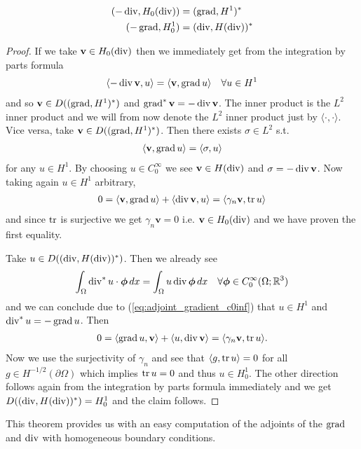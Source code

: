 \documentclass[../main.tex]{subfiles}
\begin{document}
\begin{theorem}\label{thm:adjoints_grad_div_without_bc}
    \begin{align}
        (-\operatorname{div}, H_0(\operatorname{div})) &= (\operatorname{grad}, H^1)^* \\
        (-\operatorname{grad}, H_0^1) &= (\operatorname{div}, H(\operatorname{div}))^*
    \end{align}
\end{theorem}
\begin{proof}
    If we take $\mathbf{v} \in H_0(\operatorname{div})$ then we immediately get 
    from the integration by parts formula
    \begin{align*}
        \langle -\operatorname{div} \mathbf{v}, u \rangle = \langle \mathbf{v}, \operatorname{grad} u \rangle \quad \forall u \in H^1
    \end{align*}
    and so $\mathbf{v} \in D((\operatorname{grad}, H^1)^*)$ and $\operatorname{grad}^* \mathbf{v} = -\operatorname{div} \mathbf{v}$.
    The inner product is the $L^2$ inner product and we will from now denote the $L^2$ inner 
    product just by $\langle \cdot , \cdot \rangle$.
    Vice versa, take $\mathbf{v} \in D((\operatorname{grad}, H^1)^*)$. Then there exists 
    $\sigma \in L^2$ s.t.
    \begin{align*}
        \langle \mathbf{v}, \operatorname{grad} u\rangle = \langle \sigma, u \rangle
    \end{align*}
    for any $u \in H^1$. By choosing $u \in C_0^\infty$ we see 
    $\mathbf{v} \in H(\operatorname{div})$ and $\sigma = -\operatorname{div} \mathbf{v}$. 
    Now taking again $u \in H^1$ arbitrary,
    \begin{align*}
        0 = \langle \mathbf{v}, \operatorname{grad} u \rangle + \langle \operatorname{div} \mathbf{v}, u \rangle
        = \langle \gamma_n \mathbf{v}, \operatorname{tr} u \rangle
    \end{align*}
    and since $\operatorname{tr}$ is surjective we get $\gamma_n \mathbf{v} = 0$ i.e. 
    $\mathbf{v} \in H_0(\operatorname{div})$ and we have proven the first equality.

    Take $u \in D((\operatorname{div}, H(\operatorname{div}))^*)$. Then we already see
    \begin{align*}
        \int_\Omega \operatorname{div}^*u \cdot \bm{\phi} \, dx
        = \int_\Omega u \operatorname{div} \bm{\phi} \, dx \quad \forall \bm{\phi} \in C_0^\infty(\Omega;\mathbb{R}^3)
    \end{align*}
    and we can conclude due to (\ref{eq:adjoint_gradient_c0inf}) that $u \in H^1$ and
    $\operatorname{div}^*u = -\operatorname{grad} u$. Then 
    \begin{align*}
        0 = \langle \operatorname{grad} u, \mathbf{v} \rangle
            + \langle u, \operatorname{div} \mathbf{v} \rangle
        = \langle \gamma_n \mathbf{v}, \operatorname{tr} u \rangle.
    \end{align*}
    Now we use the surjectivity of $\gamma_n$ and see that 
    $\langle g, \operatorname{tr} u \rangle = 0$ for all $g \in H^{-1/2}(\partial \Omega)$ which 
    implies $\operatorname{tr} u = 0$ and thus $u \in H^1_0$. The other direction follows again 
    from the integration by parts formula immediately and we get 
    $D((\operatorname{div}, H(\operatorname{div}))^*) = H^1_0$ and the claim follows.
\end{proof}
This theorem provides us with an easy computation of the adjoints 
of the $\operatorname{grad}$ and $\operatorname{div}$ with homogeneous boundary conditions.
\end{document}
